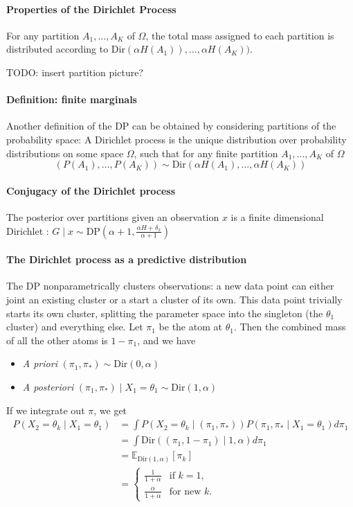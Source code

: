 \documentclass[twoside]{article}
\newcommand{\Dir}{\mathrm{Dir}}
\newcommand{\DP}{\mathrm{DP}}
\newcommand{\todo}[1]{{\color{red} TODO: #1}}
\begin{document}
\paragraph{Properties of the Dirichlet Process}
For any partition $A_1,...,A_K$ of $\Omega$, the total mass assigned to each partition is distributed according to $\Dir(\alpha H(A_1)),\ldots, \alpha H(A_K))$.

\todo{insert partition picture?}

\paragraph{Definition: finite marginals}
Another definition of the DP can be obtained by considering partitions of the probability space: A Dirichlet process is the unique distribution over probability distributions on some space $\Omega$, such that for any finite partition $A_1,...,A_K$ of $\Omega$
\[
\left( P(A_1),\ldots, P(A_K) \right) \sim \Dir{\left( \alpha H(A_1),\ldots, \alpha H(A_K) \right)}
\]

\paragraph{Conjugacy of the Dirichlet process}
The posterior over partitions given an observation $x$ is a finite dimensional Dirichlet :
$ G \mid x \sim \DP(\alpha+1, \frac{\alpha H + \delta_x}{\alpha + 1})$

\paragraph{The Dirichlet process as a predictive distribution}

The DP nonparametrically clusters observations: a new data point can either joint an existing cluster or a start a cluster of its own.  This data point trivially starts its own cluster, splitting the parameter space into the singleton (the $\theta_1$ cluster) and everything else.  Let $\pi_1$ be the atom at $\theta_1$.  Then the combined mass of all the other atoms is $1 - \pi_1$, and we have
\begin{itemize}
\item \emph{A priori} $(\pi_1,\pi_*) \sim \Dir(0,\alpha)$
\item \emph{A posteriori} $(\pi_1,\pi_*) \mid X_1 = \theta_1 \sim \Dir(1,\alpha)$
\end{itemize}

If we integrate out $\pi$, we get
\begin{align*}
   P(X_2 = \theta_k \mid X_1 = \theta_1)
&= \int P(X_2 = \theta_k \mid (\pi_1,\pi_*)) P(\pi_1,\pi_* \mid X_1=\theta_1) d\pi_1  \\
&= \int \Dir((\pi_1,1-\pi_1) \mid 1,\alpha) d\pi_1 \\
&= \mathbb{E}_{\Dir(1,\alpha)}[\pi_k] \\
&= \begin{cases}
    \frac{1}{1+\alpha} & \text{if } k=1,\\
    \frac{\alpha}{1+\alpha} & \text{for new } k.
\end{cases}
\end{align*}
\end{document}
